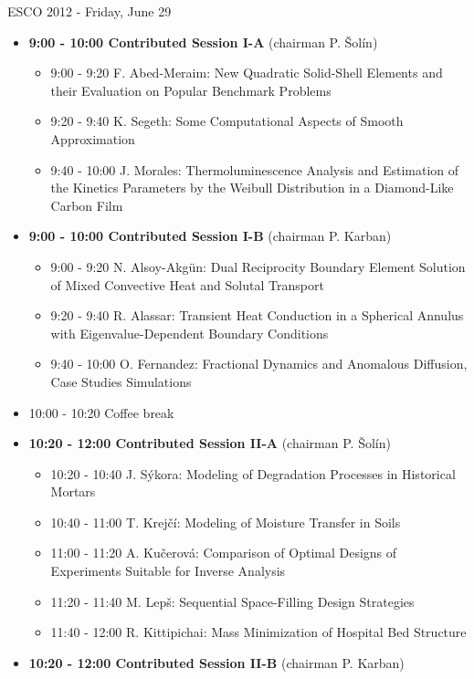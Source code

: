 \documentclass[10pt, A4]{article}%
\begin{document}
\centerline{\huge ESCO 2012 - Friday, June 29}
\vspace{4mm}
\begin{itemize}    
  \item {\bf 9:00 - 10:00 Contributed Session I-A} (chairman P. \v{S}ol\'{i}n) 
  \begin{itemize}
    \item 9:00 - 9:20 F. Abed-Meraim: New Quadratic Solid-Shell Elements and their Evaluation on Popular Benchmark Problems
    \item 9:20 - 9:40 K. Segeth: Some Computational Aspects of Smooth Approximation
    \item 9:40 - 10:00 J. Morales: Thermoluminescence Analysis and Estimation of the Kinetics Parameters by the Weibull Distribution in a Diamond-Like Carbon Film
  \end{itemize}
  \item {\bf 9:00 - 10:00 Contributed Session I-B} (chairman P. Karban) 
  \begin{itemize}
    \item 9:00 - 9:20 N. Alsoy-Akg\"{u}n: Dual Reciprocity Boundary Element Solution of Mixed Convective Heat and Solutal Transport
    \item 9:20 - 9:40 R. Alassar: Transient Heat Conduction in a Spherical Annulus with Eigenvalue-Dependent Boundary Conditions
    \item 9:40 - 10:00 O. Fernandez: Fractional Dynamics and Anomalous Diffusion, Case Studies Simulations
  \end{itemize}
  \item 10:00 - 10:20 Coffee break
  \item {\bf 10:20 - 12:00 Contributed Session II-A} (chairman P. \v{S}ol\'{i}n) 
  \begin{itemize}
    \item 10:20 - 10:40 J. S\'{y}kora: Modeling of Degradation Processes in Historical Mortars
    \item 10:40 - 11:00 T. Krej\v{c}\'{i}: Modeling of Moisture Transfer in Soils
    \item 11:00 - 11:20 A. Ku\v{c}erov\'{a}: Comparison of Optimal Designs of Experiments Suitable for Inverse Analysis
    \item 11:20 - 11:40 M. Lep\v{s}: Sequential Space-Filling Design Strategies
    \item 11:40 - 12:00 R. Kittipichai: Mass Minimization of Hospital Bed Structure
  \end{itemize}
    \item {\bf 10:20 - 12:00 Contributed Session II-B} (chairman P. Karban) 

\end{itemize}
\end{document}
